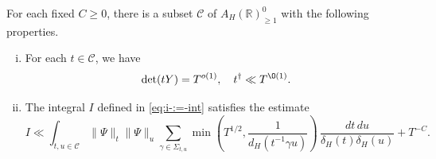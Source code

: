 \begin{lemma}\label{lem:standard2:each-fixed-c}
  For each fixed $C \geq 0$, there is a subset $\mathcal{C}$ of $A_H(\mathbb{R})^0_{\geq 1}$ with the following properties.
  \begin{enumerate}[(i)]
  \item For each $t \in \mathcal{C}$, we have
    \begin{equation}\label{eq:detr-=-dety}
      \det(t Y)  = T^{o(1)}, \quad t^\dagger \ll T^{\O(1)}.
    \end{equation}
  \item The integral $I$ defined in \eqref{eq:i-:=-int} satisfies the estimate
    \begin{equation}\label{eq:mathcale-ll-tn2-restricted-to-C}
      I \ll
      \int_{t, u  \in \mathcal{C} }
      \|\Psi\|_{t}
      \|\Psi\|_{u}
      \sum_{\gamma \in \Sigma_{t,u}}
      \min \left( T^{1/2}, \frac{1}{d_H(t^{-1} \gamma u)} \right)
      \, \frac{d t \, d u}{\delta_H(t) \delta_H(u)}
      + T^{-C}.
    \end{equation}
  \end{enumerate}
\end{lemma}
